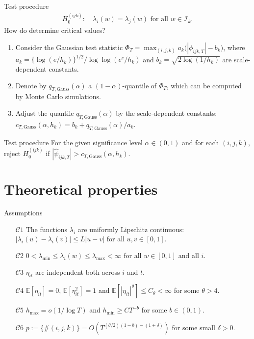 \documentclass[10pt]{beamer}
\newcommand{\E}{\mathbb{E}}
\begin{document}
\begin{frame}[label = frame_test]{Test procedure}
\begin{align*}
H_0^{(ijk)}: \quad \lambda_i(w) = \lambda_j(w) \text{ for all } w \in \mathcal{I}_k.
\end{align*} \pause
How do determine critical values?\pause
\vspace{-2mm}
\begin{enumerate}
	\item Consider the Gaussian test statistic $ \Phi_T = \max_{(i,j,k)} a_k \big( |\phi_{ijk,T}| - b_k \big) $, where $a_k = \{\log(e/h_k)\}^{1/2} / \log \log(e^e / h_k)$ and $b_k = \sqrt{2 \log(1/h_k)}$ are scale-dependent constants.\pause
	\item Denote by $q_{T, \text{Gauss}} (\alpha)$ a $(1-\alpha)$-quantile of $\Phi_T$, which can be computed by Monte Carlo simulations.\pause
	\item Adjust the quantile $q_{T, \text{Gauss}} (\alpha)$ by the scale-dependent constants: $c_{T,\text{Gauss}}(\alpha,h_k) = b_k + q_{T,\text{Gauss}}(\alpha)/a_k$. \hyperlink{frame_constants}{} \pause
\end{enumerate}
\begin{block}{Test procedure}
For the given significance level $\alpha \in (0,1)$ and for each $(i,j,k)$, reject $H_0^{(ijk)}$ if $|\widehat{\psi}_{ijk,T}| > c_{T,\text{Gauss}}(\alpha,h_k)$.
\end{block}
\end{frame}

\section{Theoretical properties}
\begin{frame}{Assumptions}
\begin{itemize}
\item[$\mathcal{C}1$] \label{C1} The functions $\lambda_i$ are uniformly Lipschitz continuous: $|\lambda_i(u) - \lambda_i(v)| \le L |u-v|$ for all $u, v \in [0,1]$.
\item[$\mathcal{C}2$] \label{C2} $0 < \lambda_{\min} \le \lambda_i(w) \le \lambda_{\max} < \infty$ for all $w \in [0, 1]$ and all $i$. 
\item[$\mathcal{C}3$] \label{C3} $\eta_{it}$ are independent both across $i$ and $t$.
\item[$\mathcal{C}4$] \label{C4} $\E[\eta_{it}] = 0$, $\E[\eta_{it}^2] = 1$ and $\E[|\eta_{it}|^\theta] \le C_\theta < \infty$ for some $\theta > 4$. 
\item[$\mathcal{C}5$] \label{C5} $h_{\max} = o(1/\log T)$ and $h_{\min} \ge CT^{-b}$ for some $b \in (0,1)$.
\item[$\mathcal{C}6$] \label{C6} $p := \{ \# (i, j, k) \} = O(T^{(\theta/2)(1-b)-(1+\delta)})$ for some small $\delta > 0$.
\end{itemize}
\end{frame}
\end{document}
